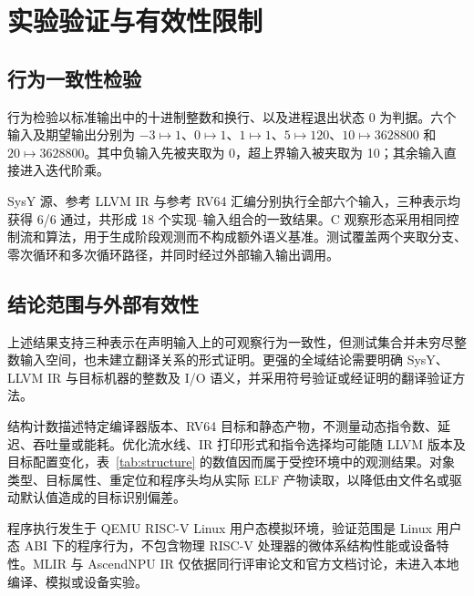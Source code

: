 \section{实验验证与有效性限制}
\label{sec:validation}

\subsection{行为一致性检验}

行为检验以标准输出中的十进制整数和换行、以及进程退出状态 0 为判据。六个输入及期望输出分别为 $-3\mapsto1$、$0\mapsto1$、$1\mapsto1$、$5\mapsto120$、$10\mapsto3628800$ 和 $20\mapsto3628800$。其中负输入先被夹取为 0，超上界输入被夹取为 10；其余输入直接进入迭代阶乘。

SysY 源、参考 LLVM IR 与参考 RV64 汇编分别执行全部六个输入，三种表示均获得 6/6 通过，共形成 18 个实现--输入组合的一致结果。C 观察形态采用相同控制流和算法，用于生成阶段观测而不构成额外语义基准。测试覆盖两个夹取分支、零次循环和多次循环路径，并同时经过外部输入输出调用。

\subsection{结论范围与外部有效性}

上述结果支持三种表示在声明输入上的可观察行为一致性，但测试集合并未穷尽整数输入空间，也未建立翻译关系的形式证明。更强的全域结论需要明确 SysY、LLVM IR 与目标机器的整数及 I/O 语义，并采用符号验证或经证明的翻译验证方法。

结构计数描述特定编译器版本、RV64 目标和静态产物，不测量动态指令数、延迟、吞吐量或能耗。优化流水线、IR 打印形式和指令选择均可能随 LLVM 版本及目标配置变化，表~\ref{tab:structure} 的数值因而属于受控环境中的观测结果。对象类型、目标属性、重定位和程序头均从实际 ELF 产物读取，以降低由文件名或驱动默认值造成的目标识别偏差。

程序执行发生于 QEMU RISC-V Linux 用户态模拟环境\cite{qemu-user-2026}，验证范围是 Linux 用户态 ABI 下的程序行为，不包含物理 RISC-V 处理器的微体系结构性能或设备特性。MLIR 与 AscendNPU IR 仅依据同行评审论文和官方文档讨论，未进入本地编译、模拟或设备实验。
